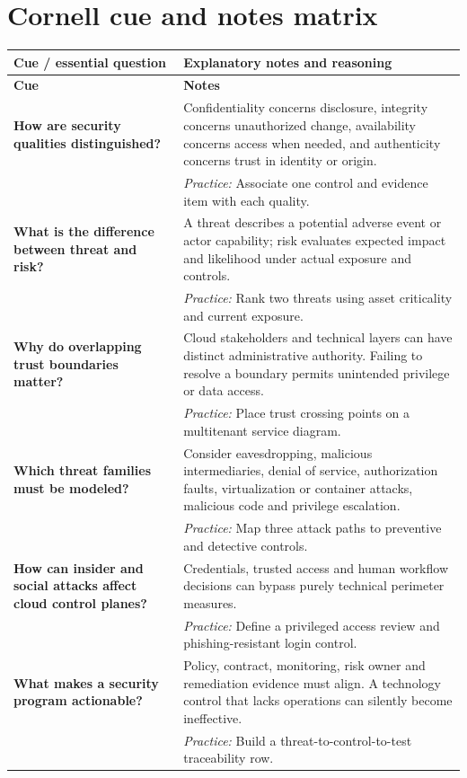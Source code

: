 \documentclass[10pt,letterpaper]{article}
\begin{document}
\section{Cornell cue and notes matrix}
\small\setlength{\LTleft}{0pt}\setlength{\LTright}{0pt plus 1fill}
\begin{longtable}{>{\RaggedRight\arraybackslash}p{}>{\RaggedRight\arraybackslash}p{}}
\toprule\textbf{Cue / essential question}&\textbf{Explanatory notes and reasoning}\\\midrule\endfirsthead\toprule\textbf{Cue}&\textbf{Notes}\\\midrule\endhead
\textbf{How are security qualities distinguished?} & Confidentiality concerns disclosure, integrity concerns unauthorized change, availability concerns access when needed, and authenticity concerns trust in identity or origin.\\[3pt]& \textcolor{petrol}{\emph{Practice:} Associate one control and evidence item with each quality.}\\[8pt]\midrule
\textbf{What is the difference between threat and risk?} & A threat describes a potential adverse event or actor capability; risk evaluates expected impact and likelihood under actual exposure and controls.\\[3pt]& \textcolor{petrol}{\emph{Practice:} Rank two threats using asset criticality and current exposure.}\\[8pt]\midrule
\textbf{Why do overlapping trust boundaries matter?} & Cloud stakeholders and technical layers can have distinct administrative authority. Failing to resolve a boundary permits unintended privilege or data access.\\[3pt]& \textcolor{petrol}{\emph{Practice:} Place trust crossing points on a multitenant service diagram.}\\[8pt]\midrule
\textbf{Which threat families must be modeled?} & Consider eavesdropping, malicious intermediaries, denial of service, authorization faults, virtualization or container attacks, malicious code and privilege escalation.\\[3pt]& \textcolor{petrol}{\emph{Practice:} Map three attack paths to preventive and detective controls.}\\[8pt]\midrule
\textbf{How can insider and social attacks affect cloud control planes?} & Credentials, trusted access and human workflow decisions can bypass purely technical perimeter measures.\\[3pt]& \textcolor{petrol}{\emph{Practice:} Define a privileged access review and phishing-resistant login control.}\\[8pt]\midrule
\textbf{What makes a security program actionable?} & Policy, contract, monitoring, risk owner and remediation evidence must align. A technology control that lacks operations can silently become ineffective.\\[3pt]& \textcolor{petrol}{\emph{Practice:} Build a threat-to-control-to-test traceability row.}\\[8pt]\midrule
\end{longtable}\normalsize
\end{document}
